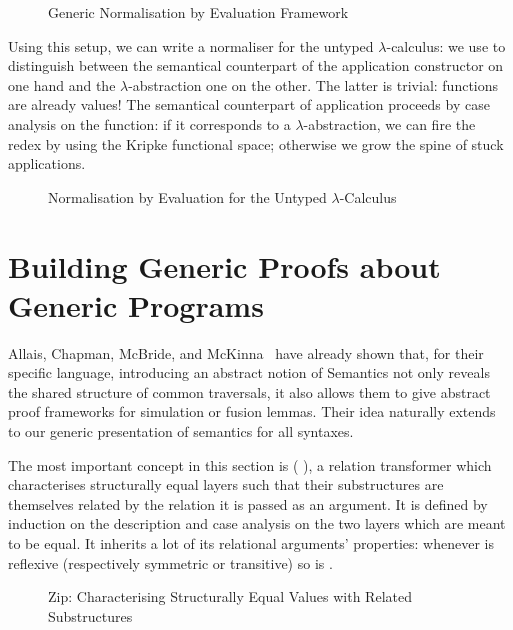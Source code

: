 \begin{figure}[h]
\caption{Generic Normalisation by Evaluation Framework}
\end{figure}

Using this setup, we can write a normaliser for the untyped
$\lambda$-calculus: we use  to distinguish between
the semantical counterpart of the application constructor on
one hand and the $\lambda$-abstraction one on the other.
The latter is trivial: functions are already
values! The semantical counterpart of application proceeds by
case analysis on the function: if it corresponds to a
$\lambda$-abstraction, we can fire the redex by using the Kripke
functional space; otherwise we grow the spine of stuck
applications.


\begin{figure}[h]
\caption{Normalisation by Evaluation for the Untyped $\lambda$-Calculus}
\end{figure}


\section{Building Generic Proofs about Generic Programs}\label{section:simulation}

Allais, Chapman, McBride, and McKinna~\citeyear{allais2017type} have
already shown that, for their specific language, introducing an abstract
notion of Semantics not only reveals the shared structure of common
traversals, it also allows them to give abstract proof frameworks for
simulation or fusion lemmas. Their idea naturally extends to our generic
presentation of semantics for all syntaxes.

The most important concept in this section is ( ), a relation
transformer which characterises structurally equal layers such that their
substructures are themselves related by the relation it is passed as an
argument. It is defined by induction on the description and case analysis
on the two layers which are meant to be equal. It inherits a lot of its
relational arguments' properties: whenever  is reflexive (respectively
symmetric or transitive) so is   .

\begin{figure}[h]
\caption{Zip: Characterising Structurally Equal Values with Related Substructures}
\end{figure}

